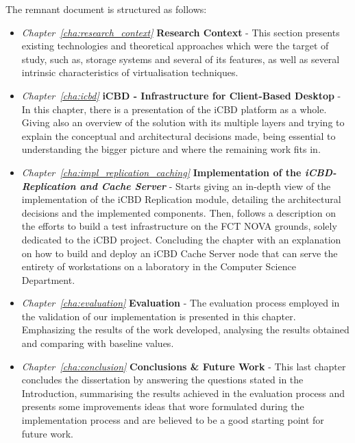 The remnant document is structured as follows: 

\begin{itemize}

  \item \textit{Chapter~\ref{cha:research_context}}  \textbf{Research Context} - This section presents existing technologies and theoretical approaches which were the target of study, such as, storage systems and several of its features, as well as several intrinsic characteristics of virtualisation techniques.
  \item \textit{Chapter~\ref{cha:icbd}} \textbf{iCBD - Infrastructure for Client-Based Desktop} - In this chapter, there is a presentation of the iCBD platform as a whole. Giving also an overview of the solution with its multiple layers and trying to explain the conceptual and architectural decisions made, being essential to understanding the bigger picture and where the remaining work fits in.
  \item \textit{Chapter~\ref{cha:impl_replication_caching}} \textbf{Implementation of the \textit{iCBD-Replication and Cache Server}} - Starts giving an in-depth view of the implementation of the iCBD Replication module, detailing the architectural decisions and the implemented components. Then, follows a description on the efforts to build a test infrastructure on the FCT NOVA grounds, solely dedicated to the iCBD project. Concluding the chapter with an explanation on how to build and deploy an iCBD Cache Server node that can serve the entirety of workstations on a laboratory in the Computer Science Department.
  \item \textit{Chapter~\ref{cha:evaluation}} \textbf{Evaluation} - The evaluation process employed in the validation of our implementation is presented in this chapter. Emphasizing the results of the work developed, analysing the results obtained and comparing with baseline values.
  \item \textit{Chapter~\ref{cha:conclusion}} \textbf{Conclusions \& Future Work} - This last chapter concludes the dissertation by answering the questions stated in the Introduction, summarising the results achieved in the evaluation process and presents some improvements ideas that wore formulated during the implementation process and are believed to be a good starting point for future work.
\end{itemize}

